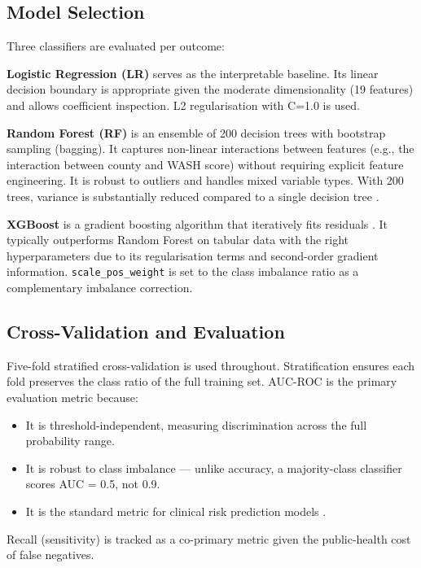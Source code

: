 \documentclass[12pt, a4paper]{article}
\begin{document}
\subsection{Model Selection}

Three classifiers are evaluated per outcome:

\textbf{Logistic Regression (LR)} serves as the interpretable baseline.
Its linear decision boundary is appropriate given the moderate
dimensionality (19 features) and allows coefficient inspection. L2
regularisation with C=1.0 is used.

\textbf{Random Forest (RF)} is an ensemble of 200 decision trees with
bootstrap sampling (bagging). It captures non-linear interactions between
features (e.g., the interaction between county and WASH score) without
requiring explicit feature engineering. It is robust to outliers and
handles mixed variable types. With 200 trees, variance is substantially
reduced compared to a single decision tree \citep{Breiman2001}.

\textbf{XGBoost} is a gradient boosting algorithm that iteratively fits
residuals \citep{Chen2016}. It typically outperforms Random Forest on
tabular data with the right hyperparameters due to its regularisation
terms and second-order gradient information. \texttt{scale\_pos\_weight}
is set to the class imbalance ratio as a complementary imbalance
correction.

\subsection{Cross-Validation and Evaluation}

Five-fold stratified cross-validation is used throughout. Stratification
ensures each fold preserves the class ratio of the full training set.
AUC-ROC is the primary evaluation metric because:
\begin{itemize}[noitemsep]
    \item It is threshold-independent, measuring discrimination across the
          full probability range.
    \item It is robust to class imbalance — unlike accuracy, a majority-class
          classifier scores AUC = 0.5, not 0.9.
    \item It is the standard metric for clinical risk prediction models
          \citep{Steyerberg2010}.
\end{itemize}
Recall (sensitivity) is tracked as a co-primary metric given the
public-health cost of false negatives.
\end{document}
